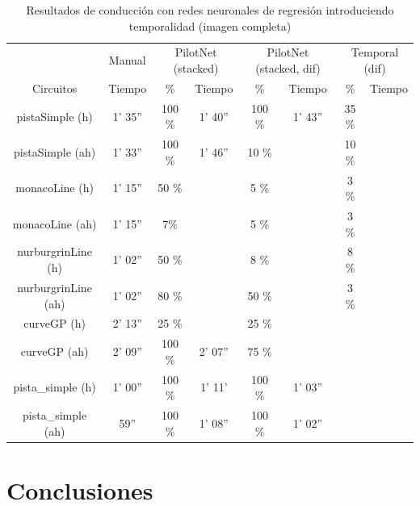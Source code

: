 \begin{table}[H]
\centering
\caption{Resultados de conducción con redes neuronales de regresión introduciendo temporalidad (imagen completa)}
\label{resultados_regresion_temporal_completa}
\begin{tabular}{c|c|c|c|c|c|c|c|}
\cline{2-8}
                          & \multicolumn{1}{c|}{Manual} & \multicolumn{2}{c|}{PilotNet (stacked)} & \multicolumn{2}{c|}{PilotNet (stacked, dif)} & \multicolumn{2}{c|}{Temporal (dif)} \\ \cline{1-8} 
                        \multicolumn{1}{|c|}{Circuitos}    & Tiempo       & \%       & Tiempo       & \%        & Tiempo  & \%        & Tiempo          \\ \hline
\multicolumn{1}{|c|}{pistaSimple (h)}    & 1' 35''      & 100 \%     & 1' 40''  & 100 \%     & 1' 43''   & 35 \%       &     \\ \hline
\multicolumn{1}{|c|}{pistaSimple (ah)}     & 1' 33''           & 100 \%   & 1' 46''    & 10 \%        &   & 10 \%       &  \\ \hline
\multicolumn{1}{|c|}{monacoLine (h)}      & 1' 15''           & 50 \%         &         & 5 \%           &     & 3 \%        &                 \\ \hline
\multicolumn{1}{|c|}{monacoLine (ah)}       & 1' 15''    & 7\%      &         & 5 \%          &    & 3 \%       &        \\ \hline
\multicolumn{1}{|c|}{nurburgrinLine (h)}      & 1' 02''       & 50 \%       &          & 8 \%        &     & 8 \%        &     \\ \hline
\multicolumn{1}{|c|}{nurburgrinLine (ah)}       & 1' 02''     & 80 \%    &      & 50 \%     &   & 3 \%        &            \\ \hline
\multicolumn{1}{|c|}{curveGP (h)}     & 2' 13''      & 25 \%       &      & 25 \%     &     &       &           \\ \hline
\multicolumn{1}{|c|}{curveGP (ah)}       & 2' 09''            & 100 \%     & 2' 07''     &  75 \%     &   &       &        \\ \hline
\multicolumn{1}{|c|}{pista\_simple (h)}       & 1' 00''           & 100 \%     & 1' 11'      & 100 \%       & 1' 03''    &       &         \\ \hline
\multicolumn{1}{|c|}{pista\_simple (ah)}     & 59''      & 100 \%     & 1' 08''     & 100 \%       & 1' 02''    &       &                \\ \hline
\end{tabular}
\end{table}


\section{Conclusiones}